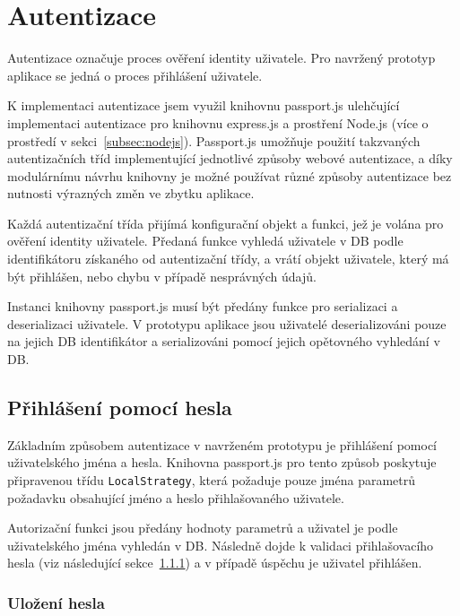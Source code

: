 
\section{Autentizace}\label{sec:realizaceAutentizace}

Autentizace označuje proces ověření identity uživatele.
Pro navržený prototyp aplikace se jedná o proces přihlášení uživatele.

K implementaci autentizace jsem využil knihovnu passport.js ulehčující implementaci autentizace pro knihovnu express.js a prostření Node.js (více o prostředí v sekci~\ref{subsec:nodejs}).
Passport.js umožňuje použití takzvaných autentizačních tříd implementující jednotlivé způsoby webové autentizace, a díky modulárnímu návrhu knihovny je možné používat různé způsoby autentizace bez nutnosti výrazných změn ve zbytku aplikace.

Každá autentizační třída přijímá konfigurační objekt a funkci, jež je volána pro ověření identity uživatele.
Předaná funkce vyhledá uživatele v DB podle identifikátoru získaného od autentizační třídy, a vrátí objekt uživatele, který má být přihlášen, nebo chybu v případě nesprávných údajů.

Instanci knihovny passport.js musí být předány funkce pro serializaci a deserializaci uživatele.
V prototypu aplikace jsou uživatelé deserializováni pouze na jejich DB identifikátor a serializováni pomocí jejich opětovného vyhledání v DB.

\subsection{Přihlášení pomocí hesla}\label{subsec:přihlášeníPomocíHesla}

Základním způsobem autentizace v navrženém prototypu je přihlášení pomocí uživatelského jména a hesla.
Knihovna passport.js pro tento způsob poskytuje připravenou třídu \texttt{LocalStrategy}, která požaduje pouze jména parametrů požadavku obsahující jméno a heslo přihlašovaného uživatele.

Autorizační funkci jsou předány hodnoty parametrů a uživatel je podle uživatelského jména vyhledán v DB.
Následně dojde k validaci přihlašovacího hesla (viz následující sekce~\ref{subsubsec:uloženíHesla}) a v případě úspěchu je uživatel přihlášen.

\subsubsection{Uložení hesla}\label{subsubsec:uloženíHesla}

